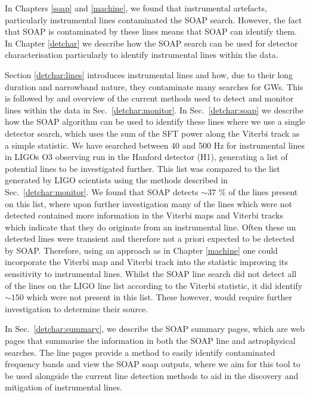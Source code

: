 \bigskip

In Chapters \ref{soap} and \ref{machine}, we found that instrumental artefacts,
particularly instrumental lines contaminated the SOAP search.  However, the
fact that SOAP is contaminated by these lines means that SOAP can identify
them.  In Chapter \ref{detchar} we describe how the SOAP search can be used for
detector characterisation particularly to identify instrumental lines within
the data.

Section \ref{detchar:lines} introduces instrumental lines and how, due to their
long duration and narrowband nature, they contaminate many searches for
\glspl{GW}.  This is followed by and overview of the current methods used to
detect and monitor lines within the data in Sec.~\ref{detchar:monitor}.  In
Sec.~\ref{detchar:soap} we describe how the SOAP algorithm can be used to
identify these lines where we use a single
detector search, which uses the sum of the \gls{SFT} power along the Viterbi track as a simple statistic.  We have searched
between 40 and 500 Hz for instrumental lines in \glspl{LIGO} O3 observing run in the Hanford detector (H1), generating
a list of potential lines to be investigated further.  This list was compared
to the list generated by \gls{LIGO} scientists using the methods described in
Sec.~\ref{detchar:monitor}.  We found that SOAP detects $\sim 37$ \% of the
lines present on this list, where upon further investigation many of the lines
which were not detected contained more information in the Viterbi maps and
Viterbi tracks which indicate that they do originate from an instrumental
line. Often these un detected lines were transient and therefore not a priori expected to be detected by SOAP. 
Therefore, using an approach as in Chapter \ref{machine} one could incorporate
the Viterbi map and Viterbi track into the statistic improving its sensitivity
to instrumental lines.  Whilst the SOAP line search did not detect all of the
lines on the \gls{LIGO} line list according to the Viterbi statistic, it did
identify $\sim 150$ which were not present in this list.  These however, would
require further investigation to determine their source.

In Sec.~\ref{detchar:summary}, we describe the SOAP summary pages, which are
web pages that summarise the information in both the SOAP line and
astrophysical searches.  The line pages provide a method to easily identify
contaminated frequency bands and view the SOAP soap outputs, where we aim for
this tool to be used alongside the current line detection methods to aid in the
discovery and mitigation of instrumental lines.

